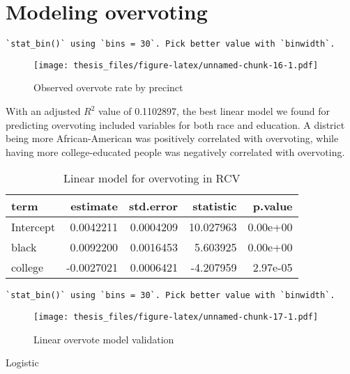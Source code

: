 \documentclass[12pt,twoside]{reedthesis}
\theoremstyle{definition}
\theoremstyle{definition}
\theoremstyle{definition}
\theoremstyle{remark}
\begin{document}
\hypertarget{modeling-overvoting}{%
\section{Modeling overvoting}\label{modeling-overvoting}}
\begin{verbatim}
`stat_bin()` using `bins = 30`. Pick better value with `binwidth`.
\end{verbatim}
\begin{figure}
\centering
\texttt{[image: thesis\_files/figure-latex/unnamed-chunk-16-1.pdf]}
\caption{\label{fig:unnamed-chunk-16}Observed overvote rate by precinct}
\end{figure}
With an adjusted \(R^2\) value of 0.1102897, the best linear model we
found for predicting overvoting included variables for both race and
education. A district being more African-American was positively
correlated with overvoting, while having more college-educated people
was negatively correlated with overvoting.
\begin{longtable}[t]{lrrrr}
\caption[Linear overvote model]{\label{tab:unnamed-chunk-17}Linear model for overvoting in RCV}\\
\toprule
term & estimate & std.error & statistic & p.value\\
\midrule
Intercept & 0.0042211 & 0.0004209 & 10.027963 & 0.00e+00\\
black & 0.0092200 & 0.0016453 & 5.603925 & 0.00e+00\\
college & -0.0027021 & 0.0006421 & -4.207959 & 2.97e-05\\
\bottomrule
\end{longtable}
\begin{verbatim}
`stat_bin()` using `bins = 30`. Pick better value with `binwidth`.
\end{verbatim}
\begin{figure}
\centering
\texttt{[image: thesis\_files/figure-latex/unnamed-chunk-17-1.pdf]}
\caption{\label{fig:unnamed-chunk-17}Linear overvote model validation}
\end{figure}
Logistic
\end{document}
